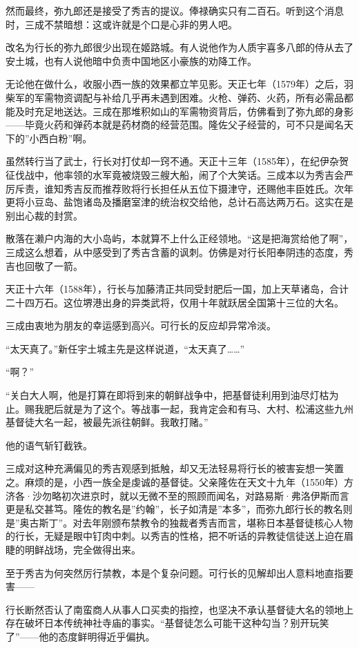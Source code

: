 \documentclass[
]{article}
\begin{document}
然而最终，弥九郎还是接受了秀吉的提议。俸禄确实只有二百石。听到这个消息时，三成不禁暗想：这或许就是个口是心非的男人吧。

改名为行长的弥九郎很少出现在姬路城。有人说他作为人质宇喜多八郎的侍从去了安土城，也有人说他暗中负责中国地区小豪族的劝降工作。

无论他在做什么，收服小西一族的效果都立竿见影。天正七年（1579年）之后，羽柴军的军需物资调配与补给几乎再未遇到困难。火枪、弹药、火药，所有必需品都能及时充足地送达。三成在那堆积如山的军需物资背后，仿佛看到了弥九郎的身影------毕竟火药和弹药本就是药材商的经营范围。隆佐父子经营的，可不只是闻名天下的''小西白粉''啊。

虽然转行当了武士，行长对打仗却一窍不通。天正十三年（1585年），在纪伊杂贺征伐战中，他率领的水军竟被烧毁三艘大船，闹了个大笑话。三成本以为秀吉会严厉斥责，谁知秀吉反而推荐败将行长担任从五位下摄津守，还赐他丰臣姓氏。次年更将小豆岛、盐饱诸岛及播磨室津的统治权交给他，总计石高达两万石。这实在是别出心裁的封赏。

散落在濑户内海的大小岛屿，本就算不上什么正经领地。``这是把海赏给他了啊''，三成这么想着，从中感受到了秀吉含蓄的讽刺。仿佛是对行长阳奉阴违的态度，秀吉也回敬了一箭。

天正十六年（1588年），行长与加藤清正共同受封肥后一国，加上天草诸岛，合计二十四万石。这位堺港出身的异类武将，仅用十年就跃居全国第十三位的大名。

三成由衷地为朋友的幸运感到高兴。可行长的反应却异常冷淡。

``太天真了。''新任宇土城主先是这样说道，``太天真了\ldots\ldots{}''

``啊？''

``关白大人啊，他是打算在即将到来的朝鲜战争中，把基督徒利用到油尽灯枯为止。赐我肥后就是为了这个。等战事一起，我肯定会和有马、大村、松浦这些九州基督徒大名一起，被最先派往朝鲜。我敢打赌。''

他的语气斩钉截铁。

三成对这种充满偏见的秀吉观感到抵触，却又无法轻易将行长的被害妄想一笑置之。麻烦的是，小西一族全是虔诚的基督徒。父亲隆佐在天文十九年（1550年）方济各·沙勿略初次进京时，就以无微不至的照顾而闻名，对路易斯·弗洛伊斯而言更是私交甚笃。隆佐的教名是''约翰''，长子如清是''本多''，而弥九郎行长的教名则是''奥古斯丁''。对去年刚颁布禁教令的独裁者秀吉而言，堪称日本基督徒核心人物的行长，无疑是眼中钉肉中刺。以秀吉的性格，把不听话的异教徒信徒送上迫在眉睫的明鲜战场，完全做得出来。

至于秀吉为何突然厉行禁教，本是个复杂问题。可行长的见解却出人意料地直指要害------

行长断然否认了南蛮商人从事人口买卖的指控，也坚决不承认基督徒大名的领地上存在破坏日本传统神社寺庙的事实。``基督徒怎么可能干这种勾当？别开玩笑了''------他的态度鲜明得近乎偏执。
\end{document}
